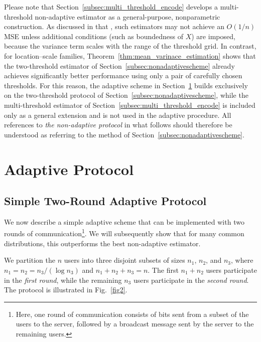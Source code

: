 \documentclass[10pt]{article} %
\theoremstyle{plain}
\theoremstyle{definition}
\theoremstyle{remark}
\newcommand{\rkcomment}[1]{\textcolor{blue}{RK: #1}}
\begin{document}
\par %
Please note that Section~\ref{subsec:multi_threshold_encode} develops a multi-threshold non-adaptive estimator as a 
general-purpose, nonparametric construction. As discussed in that , such estimators may not achieve an $O(1/n)$ MSE unless additional conditions  (such as boundedness of $X$) are imposed, because the variance term scales with the range of the threshold grid. In contrast, for location–scale families, Theorem~\ref{thm:mean_varinace_estimation} shows that the two-threshold estimator of Section~\ref{subsec:nonadaptivescheme} already achieves significantly 
better performance using only a pair of carefully chosen thresholds. For this reason, the adaptive scheme in Section~\ref{adaptivescheme} builds exclusively on  the two-threshold protocol of Section~\ref{subsec:nonadaptivescheme}, while the multi-threshold  estimator of Section~\ref{subsec:multi_threshold_encode} is included only as a general extension and is  not used in the adaptive procedure. All references to \emph{the non-adaptive protocol} in what follows should therefore be understood as referring to the method of Section~\ref{subsec:nonadaptivescheme}.



\section{Adaptive Protocol}\label{adaptivescheme}

\subsection{Simple Two-Round Adaptive Protocol}
We now describe a simple adaptive scheme that can be implemented with two rounds of communication\footnote{Here, one round of communication consists of bits sent from a subset of the users to the server, followed by a broadcast message sent by the server to the remaining users.}. We will subsequently show that for many common distributions, this outperforms the best non-adaptive estimator.

\par We partition the $n$ users into three disjoint subsets of sizes $n_1$, $n_2$, and $n_3$, where $n_1 = n_2 = n_3/(\log n_3)$ and $n_1 + n_2 + n_3 = n$. The first $n_1 + n_2$ users participate in the \emph{first round}, while the remaining $n_3$ users participate in the \emph{second round}. The protocol is illustrated in Fig.~\ref{fig2}.
\end{document}
